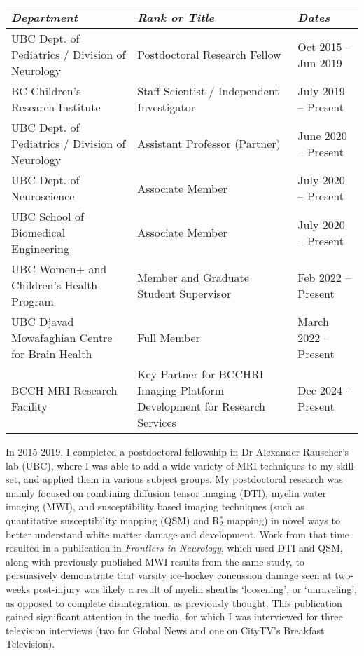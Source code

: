 \documentclass[11pt,notitlepage,english]{report}
\begin{document}
\begin{table}[H]
  \begin{tabular}{|L{8cm}|L{5cm}|l|}
    \hline
    \textit{Department}                             & \textit{Rank or Title}                     & \textit{Dates}       \\
    \hline
    UBC Dept. of Pediatrics / Division of Neurology & Postdoctoral Research Fellow               & Oct 2015 – Jun 2019  \\
    \hline
    BC Children’s Research Institute                & Staff Scientist / Independent Investigator & July 2019 – Present  \\
    \hline
    UBC Dept. of Pediatrics / Division of Neurology & Assistant Professor (Partner)              & June 2020 – Present  \\
    \hline
    UBC Dept. of Neuroscience                       & Associate Member                           & July 2020 – Present  \\
    \hline
    UBC School of Biomedical Engineering            & Associate Member                           & July 2020 – Present  \\
    \hline
    UBC Women+ and Children’s Health Program        & Member and Graduate Student Supervisor     & Feb 2022 – Present   \\
    \hline
    UBC Djavad Mowafaghian Centre for Brain Health  & Full Member                                & March 2022 – Present \\
    \hline
    BCCH MRI Research Facility & Key Partner for BCCHRI Imaging Platform Development for Research Services & Dec 2024 - Present \\
    \hline
  \end{tabular}
\end{table}

In 2015-2019, I completed a postdoctoral fellowship in Dr Alexander Rauscher’s lab (UBC), where I was able to add a wide variety of MRI techniques to my skill-set, and applied them in various subject groups. My postdoctoral research was mainly focused on combining diffusion tensor imaging (DTI), myelin water imaging (MWI), and susceptibility based imaging techniques (such as quantitative susceptibility mapping (QSM) and R$_{2}^{*}$ mapping) in novel ways to better understand white matter damage and development. Work from that time resulted in a publication in \textit{Frontiers in Neurology},  which used DTI and QSM, along with previously published MWI results from the same study, to persuasively demonstrate that varsity ice-hockey concussion damage seen at two-weeks post-injury was likely a result of myelin sheaths ‘loosening’, or ‘unraveling’, as opposed to complete disintegration, as previously thought. This publication gained significant attention in the media, for which I was interviewed for three television interviews (two for Global News and one on CityTV’s Breakfast Television).
\end{document}

